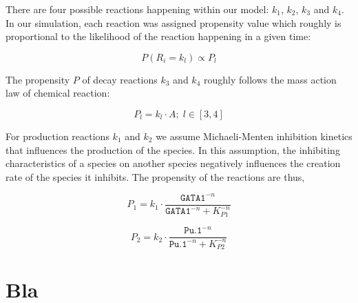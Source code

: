 \documentclass[12pt, oneside]{article}
\begin{document}
\begin{center}
\end{center}

There are four possible reactions happening within our model: $k_1$, $k_2$, $k_3$ and $k_4$. In our simulation, each reaction was assigned propensity value which roughly is proportional to the likelihood of the reaction happening in a given time:

$$P(R_i = k_l) \propto P_l$$

The propensity $P$ of decay reactions $k_3$ and $k_4$ roughly follows the mass action law of chemical reaction:

$$P_l = k_l \cdot A {;} \; l \in [3, 4]$$

For production reactions $k_1$ and $k_2$ we assume Michaeli-Menten inhibition kinetics that influences the production of the species. In this assumption, the inhibiting characteristics of a species on another species negatively influences the creation rate of the species it inhibits. The propensity of the reactions are thus,

$$P_1 = k_1 \cdot \frac{\texttt{GATA1}^{-n}}{\texttt{GATA1}^{-n} + K_{P1}^{-n}}$$

$$P_2 = k_2 \cdot \frac{\texttt{Pu.1}^{-n}}{\texttt{Pu.1}^{-n} + K_{P2}^{-n}}$$

\section{Bla}
\end{document}
